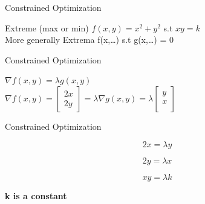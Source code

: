 \documentclass{beamer}
\begin{document}
    
    
    
    
    
    


\begin{frame}{Constrained Optimization}
    
    Extreme (max or min) $f(x,y) = x^{2}+y^{2}$ s.t $xy=k$\\
    
    \vspace{5em}
    More generally Extrema f(x,\dots) s.t g(x,\dots) = 0
    
\end{frame}

\begin{frame}{Constrained Optimization}
    
    $\nabla f(x,y) = \lambda g(x,y)$\\
    $\nabla f(x,y) = \begin{bmatrix}
    2x\\
    2y
    \end{bmatrix}
    = \lambda \nabla g(x,y)  = \lambda \begin{bmatrix}
    y\\
    x\\
    \end{bmatrix}$
\end{frame}

\begin{frame}{Constrained Optimization}
    
    \begin{equation}
            2x = \lambda y
    \end{equation}
    
    
    \begin{equation}
            2y = \lambda x
    \end{equation}
    
    
    \begin{equation}
            xy = \lambda k
    \end{equation}
    
    \textbf{k is a constant}
\end{frame}
\end{document}
